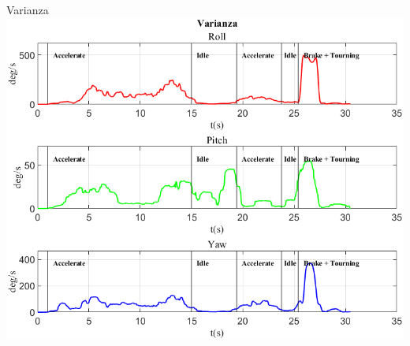 \documentclass[beamer]{standalone}
\begin{document}
	
	\begin{frame}{{Varianza}}
		\centering\includegraphics[height=.8\textheight]{figure/VAng/Varianza}
	\end{frame}
	
	
	
%	
%	
	
\end{document}

